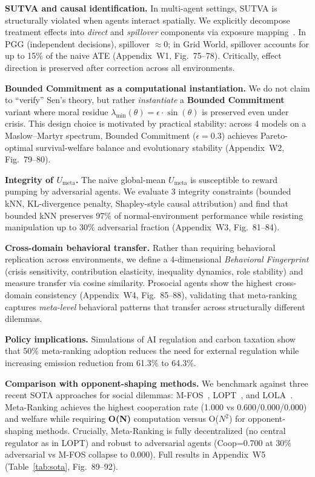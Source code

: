 \documentclass{article}
\begin{document}
\textbf{SUTVA and causal identification.} In multi-agent settings, SUTVA is structurally violated when agents interact spatially. We explicitly decompose treatment effects into \textit{direct} and \textit{spillover} components via exposure mapping~\cite{aronow2017estimating}. In PGG (independent decisions), spillover $\approx 0$; in Grid World, spillover accounts for up to 15\% of the naive ATE (Appendix~W1, Fig.~75--78). Critically, effect direction is preserved after correction across all environments.

\textbf{Bounded Commitment as a computational instantiation.} We do not claim to ``verify'' Sen's theory, but rather \textit{instantiate} a \textbf{Bounded Commitment} variant where moral residue $\lambda_{\min}(\theta) = \epsilon \cdot \sin(\theta)$ is preserved even under crisis. This design choice is motivated by practical stability: across 4 models on a Maslow--Martyr spectrum, Bounded Commitment ($\epsilon{=}0.3$) achieves Pareto-optimal survival-welfare balance and evolutionary stability (Appendix~W2, Fig.~79--80).

\textbf{Integrity of $U_{\text{meta}}$.} The naive global-mean $U_{\text{meta}}$ is susceptible to reward pumping by adversarial agents. We evaluate 3 integrity constraints (bounded kNN, KL-divergence penalty, Shapley-style causal attribution) and find that bounded kNN preserves 97\% of normal-environment performance while resisting manipulation up to 30\% adversarial fraction (Appendix~W3, Fig.~81--84).

\textbf{Cross-domain behavioral transfer.} Rather than requiring behavioral replication across environments, we define a 4-dimensional \textit{Behavioral Fingerprint} (crisis sensitivity, contribution elasticity, inequality dynamics, role stability) and measure transfer via cosine similarity. Prosocial agents show the highest cross-domain consistency (Appendix~W4, Fig.~85--88), validating that meta-ranking captures \textit{meta-level} behavioral patterns that transfer across structurally different dilemmas.

\textbf{Policy implications.} Simulations of AI regulation and carbon taxation show that 50\% meta-ranking adoption reduces the need for external regulation while increasing emission reduction from 61.3\% to 64.3\%.

\textbf{Comparison with opponent-shaping methods.} We benchmark against three recent SOTA approaches for social dilemmas: M-FOS~\cite{lu2022mfos}, LOPT~\cite{gemp2024lopt}, and LOLA~\cite{foerster2018lola}. Meta-Ranking achieves the highest cooperation rate (1.000 vs 0.600/0.000/0.000) and welfare while requiring \textbf{O(N)} computation versus O($N^2$) for opponent-shaping methods. Crucially, Meta-Ranking is fully decentralized (no central regulator as in LOPT) and robust to adversarial agents (Coop=0.700 at 30\% adversarial vs M-FOS collapse to 0.000). Full results in Appendix~W5 (Table~\ref{tab:sota}, Fig.~89--92).
\end{document}
